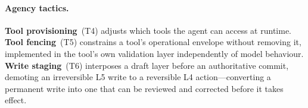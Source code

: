 \paragraph{Agency tactics.}
\textbf{Tool provisioning}~(T4) adjusts which tools the agent can access at runtime. \textbf{Tool fencing}~(T5) constrains a tool's operational envelope without removing it, implemented in the tool's own validation layer independently of model behaviour. \textbf{Write staging}~(T6) interposes a draft layer before an authoritative commit, demoting an irreversible L5 write to a reversible L4 action---converting a permanent write into one that can be reviewed and corrected before it takes effect.

